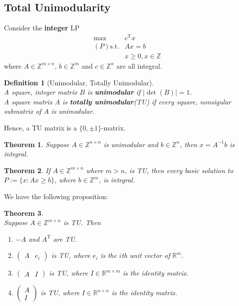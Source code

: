 \documentclass[12pt]{article}
\newcommand{\st}{\mathrm{s.t.}}
\newcommand{\T}{\mathrm{T}}
\newtheorem{definition}{Definition}[section]
\newtheorem{theorem}{Theorem}[section]
\theoremstyle{definition}
\begin{document}
\subsection{Total Unimodularity}
Consider the \textbf{integer} LP
\begin{align*}
\max & c^\T x\\
(P) \st & Ax=b\\
&x\geq 0,x\in \mathbb{Z}
\end{align*}
where $A\in\mathbb{Z}^{m\times n}$, $b\in\mathbb{Z}^m$ and $c\in\mathbb{Z}^n$ are all integral.
\begin{definition}[Unimodular, Totally Unimodular]
\hfill\\\normalfont A \textit{square, integer} matrix $B$ is \textbf{unimodular} if $|\det(B)|=1$.\\

A \textit{square} matrix $A$ is \textbf{totally unimodular}(TU) if \textit{every square, nonsigular} submatrix of $A$ is unimodular.
\end{definition}
Hence, a TU matrix is a $\{0,\pm 1\}$-matrix. 
\begin{theorem}
\normalfont Suppose $A\in\mathbb{Z}^{n\times n}$ is unimodular and $b\in\mathbb{Z}^n$, then $x=A^{-1}b$ is integral.
\end{theorem}
\begin{theorem}\normalfont If $A\in\mathbb{Z}^{m\times n}$ where $m>n$, is TU, then every basic solution to $P:=\{x:Ax\geq b\}$, where $b\in\mathbb{Z}^m$, is integral.
\end{theorem}
We have the following proposition:
\begin{theorem}
\hfill\\\normalfont Suppose $A\in\mathbb{Z}^{m\times n}$ is TU. Then
\begin{enumerate}
  \item $-A$ and $A^\T$ are TU.
  \item $\begin{pmatrix}A &e_i\end{pmatrix}$ is TU, where $e_i$ is the $i$th unit vector of $\mathbb{R}^m$.
  \item $\begin{pmatrix}A &I\end{pmatrix}$ is TU, where $I\in\mathbb{R}^{m\times m}$ is the identity matrix.
  \item $\begin{pmatrix}A\\I\end{pmatrix}$ is TU, where $I\in\mathbb{R}^{n\times n}$ is the identity matrix.
\end{enumerate}
\end{theorem}
\end{document}
